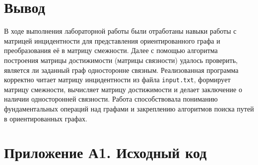 \documentclass[oneside,a4paper,14pt]{extarticle}
\begin{document}
\clearpage
\section*{Вывод}

В ходе выполнения лабораторной работы были отработаны навыки работы с матрицей инцидентности для представления ориентированного графа и преобразования её в матрицу смежности. Далее с помощью алгоритма построения матрицы достижимости (матрицы связности) удалось проверить, является ли заданный граф односторонне связным. Реализованная программа корректно читает матрицу инцидентности из файла \texttt{input.txt}, формирует матрицу смежности, вычисляет матрицу достижимости и делает заключение о наличии односторонней связности. Работа способствовала пониманию фундаментальных операций над графами и закреплению алгоритмов поиска путей в ориентированных графах.


\clearpage
\section*{Приложение А1. Исходный код}
\inputminted{cpp}{code/src/main.cpp}

\clearpage
\inputminted{cpp}{code/src/graphviz.hpp}

\inputminted{cpp}{code/src/graphviz.cpp}
\end{document}
